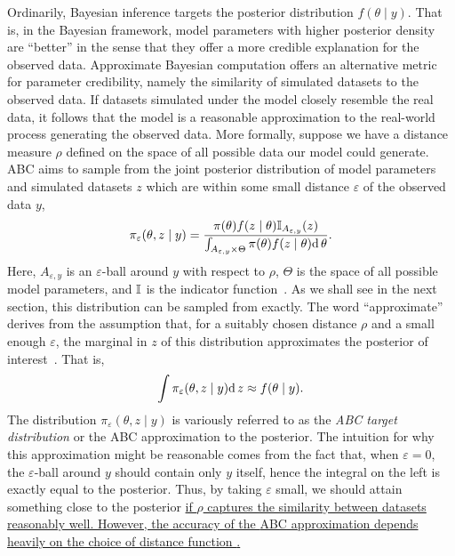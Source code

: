 Ordinarily, Bayesian inference targets the posterior distribution $f(\theta
\mid y)$. That is, in the Bayesian framework, model parameters with higher
posterior density are ``better'' in the sense that they offer a more credible
explanation for the observed data. Approximate Bayesian computation offers an
alternative metric for parameter credibility, namely the similarity of
simulated datasets to the observed data. If datasets simulated under the model
closely resemble the real data, it follows that the model is a reasonable
approximation to the real-world process generating the observed data. More
formally, suppose we have a distance measure $\rho$ defined on the space of all
possible data our model could generate. \gls{ABC} aims to sample from the joint
posterior distribution of model parameters and simulated datasets $z$ which are
within some small distance $\varepsilon$ of the observed data $y$,
\[
  \pi_{\varepsilon}(\theta, z \mid y) =
  \frac{\pi(\theta) f(z \mid \theta) \mathbb{I}_{A_{\varepsilon, y}} (z)}
  {\int_{A_{\varepsilon, y} \times \Theta} \pi(\theta) f(z \mid \theta) \mathrm{d}\, \theta}.
\]
Here, $A_{\varepsilon, y}$ is an $\varepsilon$-ball around $y$ with
respect to $\rho$, $\Theta$ is the space of all possible model parameters, and
$\mathbb{I}$ is the indicator function~\autocite{marin2012approximate}. As we shall
see in the next section, this distribution can be sampled from exactly. The
word ``approximate'' derives from the assumption that, for a suitably chosen
distance $\rho$ and a small enough $\varepsilon$, the marginal in $z$ of
this distribution approximates the posterior of
interest~\autocite{marin2012approximate}. That is,
\[
  \int \pi_\varepsilon(\theta, z \mid y) \mathrm{d}\, z \approx f(\theta \mid y).
\]
The distribution $\pi_\varepsilon(\theta, z \mid y)$ is variously referred to
as the \textit{\gls{ABC} target distribution} or the \gls{ABC} approximation
to the posterior. The intuition for why this approximation might be reasonable
comes from the fact that, when $\varepsilon = 0$, the $\varepsilon$-ball around
$y$ should contain only $y$ itself, hence the integral on the left is exactly
equal to the posterior. Thus, by taking $\varepsilon$ small, we should attain
something close to the posterior {\color{blue}\uline{if $\rho$ captures the
similarity between datasets reasonably well. However, the accuracy of the
\gls{ABC} approximation depends heavily on the choice of distance function
\autocite{aeschbacher2012novel,blum2013comparative}.}}


